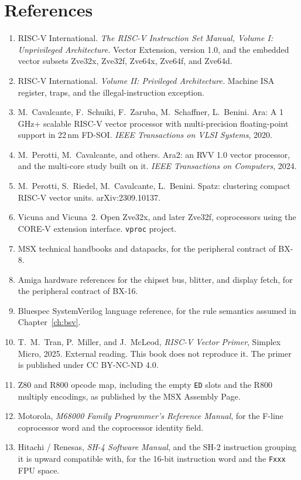 \chapter{References}

\begin{enumerate}[leftmargin=1.5em]
  \item RISC-V International. \emph{The RISC-V Instruction Set Manual, Volume I: Unprivileged Architecture.} Vector Extension, version 1.0, and the embedded vector subsets Zve32x, Zve32f, Zve64x, Zve64f, and Zve64d.
  \item RISC-V International. \emph{Volume II: Privileged Architecture.} Machine ISA register, traps, and the illegal-instruction exception.
  \item M.~Cavalcante, F.~Schuiki, F.~Zaruba, M.~Schaffner, L.~Benini. Ara: A 1\,GHz+ scalable RISC-V vector processor with multi-precision floating-point support in 22\,nm FD-SOI. \emph{IEEE Transactions on VLSI Systems}, 2020.
  \item M.~Perotti, M.~Cavalcante, and others. Ara2: an RVV 1.0 vector processor, and the multi-core study built on it. \emph{IEEE Transactions on Computers}, 2024.
  \item M.~Perotti, S.~Riedel, M.~Cavalcante, L.~Benini. Spatz: clustering compact RISC-V vector units. arXiv:2309.10137.
  \item Vicuna and Vicuna~2. Open Zve32x, and later Zve32f, coprocessors using the CORE-V extension interface. \texttt{vproc} project.
  \item MSX technical handbooks and datapacks, for the peripheral contract of BX-8.
  \item Amiga hardware references for the chipset bus, blitter, and display fetch, for the peripheral contract of BX-16.
  \item Bluespec SystemVerilog language reference, for the rule semantics assumed in Chapter~\ref{ch:bsv}.
  \item T.~M.~Tran, P.~Miller, and J.~McLeod, \emph{RISC-V Vector Primer}, Simplex Micro, 2025. External reading. This book does not reproduce it. The primer is published under CC BY-NC-ND 4.0.
  \item Z80 and R800 opcode map, including the empty \texttt{ED} slots and the R800 multiply encodings, as published by the MSX Assembly Page.
  \item Motorola, \emph{M68000 Family Programmer's Reference Manual}, for the F-line coprocessor word and the coprocessor identity field.
  \item Hitachi / Renesas, \emph{SH-4 Software Manual}, and the SH-2 instruction grouping it is upward compatible with, for the 16-bit instruction word and the \texttt{Fxxx} FPU space.

\end{enumerate}
